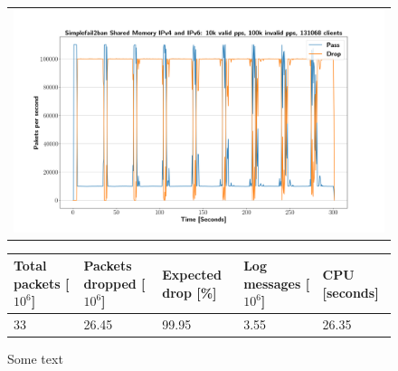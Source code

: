\begin{figure}[p]
	\label{fig:simplefail2ban:shm:ip46:100k}
	\centering
	\scriptsize
	\begin{tabular}{c}
    	\centerline{\includegraphics[width=1.2\textwidth]{images/simplefail2ban_shm_ipv46_v10k_iv100k_c131068.png}}
	\end{tabular}
	\begin{tabular}{lllll}
		\toprule
		\textbf{Total packets [$10^6$]} & \textbf{Packets dropped [$10^6$]} & \textbf{Expected drop [\%]} & \textbf{Log messages [$10^6$]} & \textbf{CPU [seconds]} \\ \midrule 
		33 & 26.45 & 99.95 & 3.55 & 26.35 \\
		\bottomrule
	\end{tabular}
	\caption[Simplefail2ban Shared Memory IPv4 \& IPv6 100k PPS]{Some text}
\end{figure}

